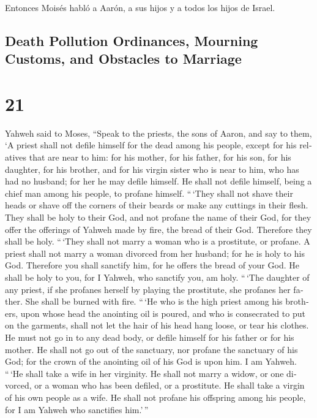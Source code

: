 \begin{paracol}{2}
 Entonces Moisés habló a Aarón, a sus hijos y a todos los
hijos de Israel.

\switchcolumn
\begin{otherlanguage}{english}

\hypertarget{death-pollution-ordinances-mourning-customs-and-obstacles-to-marriage}{%
\subsection{Death Pollution Ordinances, Mourning Customs, and Obstacles
to
Marriage}\label{death-pollution-ordinances-mourning-customs-and-obstacles-to-marriage}}

\hypertarget{section-41}{%
\section{21}\label{section-41}}

 Yahweh said to Moses, ``Speak to the priests, the sons of
Aaron, and say to them, `A priest shall not defile himself for the dead
among his people,  except for his relatives that are near
to him: for his mother, for his father, for his son, for his daughter,
for his brother,  and for his virgin sister who is near to
him, who has had no husband; for her he may defile himself.
 He shall not defile himself, being a chief man among his
people, to profane himself.  ``\,`They shall not shave
their heads or shave off the corners of their beards or make any
cuttings in their flesh.  They shall be holy to their God,
and not profane the name of their God, for they offer the offerings of
Yahweh made by fire, the bread of their God. Therefore they shall be
holy.  ``\,`They shall not marry a woman who is a
prostitute, or profane. A priest shall not marry a woman divorced from
her husband; for he is holy to his God.  Therefore you
shall sanctify him, for he offers the bread of your God. He shall be
holy to you, for I Yahweh, who sanctify you, am holy. 
``\,`The daughter of any priest, if she profanes herself by playing the
prostitute, she profanes her father. She shall be burned with fire.
 ``\,`He who is the high priest among his brothers, upon
whose head the anointing oil is poured, and who is consecrated to put on
the garments, shall not let the hair of his head hang loose, or tear his
clothes.  He must not go in to any dead body, or defile
himself for his father or for his mother.  He shall not
go out of the sanctuary, nor profane the sanctuary of his God; for the
crown of the anointing oil of his God is upon him. I am Yahweh.
 ``\,`He shall take a wife in her virginity.
 He shall not marry a widow, or one divorced, or a woman
who has been defiled, or a prostitute. He shall take a virgin of his own
people as a wife.  He shall not profane his offspring
among his people, for I am Yahweh who sanctifies him.'\,''


\end{otherlanguage}
\end{paracol}
